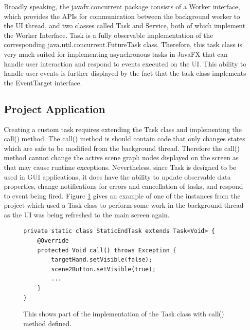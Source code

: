 Broadly speaking, the javafx.concurrent package consists of a Worker interface, which provides the APIs for communication between the background worker to the UI thread, and two classes called Task and Service, both of which implement the Worker Interface. Task is a fully observable implementation of the corresponding java.util.concurrent.FutureTask class. Therefore, this task class is very much suited for implementing asynchronous tasks in JavaFX that can handle user interaction and respond to events executed on the UI. This ability to handle user events is further displayed by the fact that the task class implements the EventTarget interface.  

\subsection{Project Application}
%
Creating a custom task requires extending the Task class and implementing the call() method. The call() method is should contain code that only changes states which are safe to be modified from the background thread. Therefore the call() method cannot change the active scene graph nodes displayed on the screen as that may cause runtime exceptions. Nevertheless, since Task is designed to be used in GUI applications, it does have the ability to update observable data properties, change notifications for errors and cancellation of tasks, and respond to event being fired. Figure \ref{fig:staticEndTask} gives an example of one of the instances from the project which used a Task class to perform some work in the background thread as the UI was being refreshed to the main screen again. 

\begin{figure}[th]
\centering
\begin{lstlisting}
private static class StaticEndTask extends Task<Void> {
	@Override
	protected Void call() throws Exception {
		targetHand.setVisible(false);
		scene2Button.setVisible(true);
		...
	}
}
\end{lstlisting}
\caption[Task Class Code]{This shows part of the implementation of the Task class with call() method defined.}
\label{fig:staticEndTask}
\end{figure}

